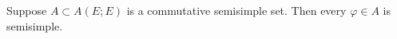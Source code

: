 Suppose $A \subset A(E; E)$ is a commutative semisimple set. Then every $\varphi \in A$ is semisimple.
